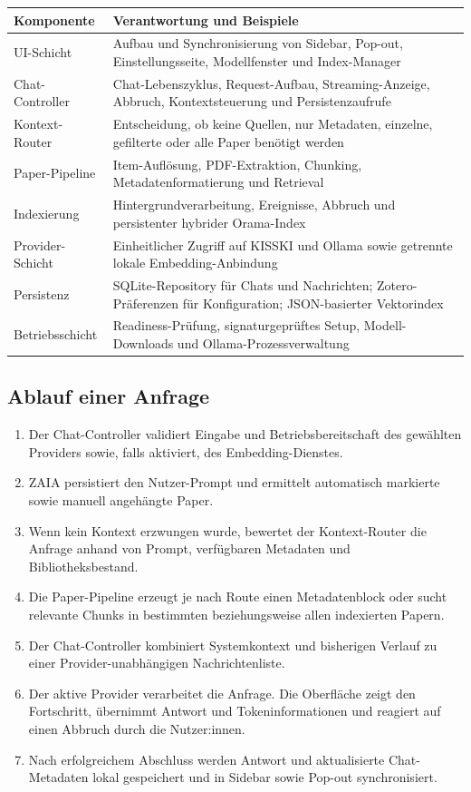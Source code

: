 \documentclass[11pt,a4paper,oneside,parskip=half]{scrartcl}
\begin{document}
\noindent\begin{tabularx}{\linewidth}{@{}L{3.7cm}Y@{}}
\toprule
\textbf{Komponente} & \textbf{Verantwortung und Beispiele} \\
\midrule
UI-Schicht & Aufbau und Synchronisierung von Sidebar, Pop-out,
  Einstellungsseite, Modellfenster und Index-Manager \\
Chat-Controller & Chat-Lebenszyklus, Request-Aufbau, Streaming-Anzeige,
  Abbruch, Kontextsteuerung und Persistenzaufrufe \\
Kontext-Router & Entscheidung, ob keine Quellen, nur Metadaten, einzelne,
  gefilterte oder alle Paper benötigt werden \\
Paper-Pipeline & Item-Auflösung, PDF-Extraktion, Chunking,
  Metadatenformatierung und Retrieval \\
Indexierung & Hintergrundverarbeitung, Ereignisse, Abbruch und persistenter
  hybrider Orama-Index \\
Provider-Schicht & Einheitlicher Zugriff auf KISSKI und Ollama sowie getrennte
  lokale Embedding-Anbindung \\
Persistenz & SQLite-Repository für Chats und Nachrichten; Zotero-Präferenzen
  für Konfiguration; JSON-basierter Vektorindex \\
Betriebsschicht & Readiness-Prüfung, signaturgeprüftes Setup,
  Modell-Downloads und Ollama-Prozessverwaltung \\
\bottomrule
\end{tabularx}

\subsection{Ablauf einer Anfrage}

\begin{enumerate}
  \item Der Chat-Controller validiert Eingabe und Betriebsbereitschaft des
    gewählten Providers sowie, falls aktiviert, des Embedding-Dienstes.
  \item ZAIA persistiert den Nutzer-Prompt und ermittelt automatisch markierte
    sowie manuell angehängte Paper.
  \item Wenn kein Kontext erzwungen wurde, bewertet der Kontext-Router die
    Anfrage anhand von Prompt, verfügbaren Metadaten und Bibliotheksbestand.
  \item Die Paper-Pipeline erzeugt je nach Route einen Metadatenblock oder sucht
    relevante Chunks in bestimmten beziehungsweise allen indexierten Papern.
  \item Der Chat-Controller kombiniert Systemkontext und bisherigen Verlauf zu
    einer Provider-unabhängigen Nachrichtenliste.
  \item Der aktive Provider verarbeitet die Anfrage. Die Oberfläche zeigt den
    Fortschritt, übernimmt Antwort und Tokeninformationen und reagiert auf einen
    Abbruch durch die Nutzer:innen.
  \item Nach erfolgreichem Abschluss werden Antwort und aktualisierte
    Chat-Metadaten lokal gespeichert und in Sidebar sowie Pop-out synchronisiert.
\end{enumerate}
\end{document}
